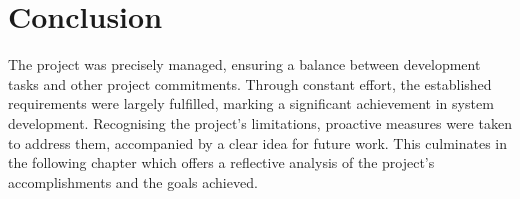 \section{Conclusion}
\label{evaluation:conclusion}

The project was precisely managed, ensuring a balance between development tasks and other project commitments. Through constant effort, the established requirements were largely fulfilled, marking a significant achievement in system development. Recognising the project's limitations, proactive measures were taken to address them, accompanied by a clear idea for future work. This culminates in the following chapter which offers a reflective analysis of the project's accomplishments and the goals achieved.



